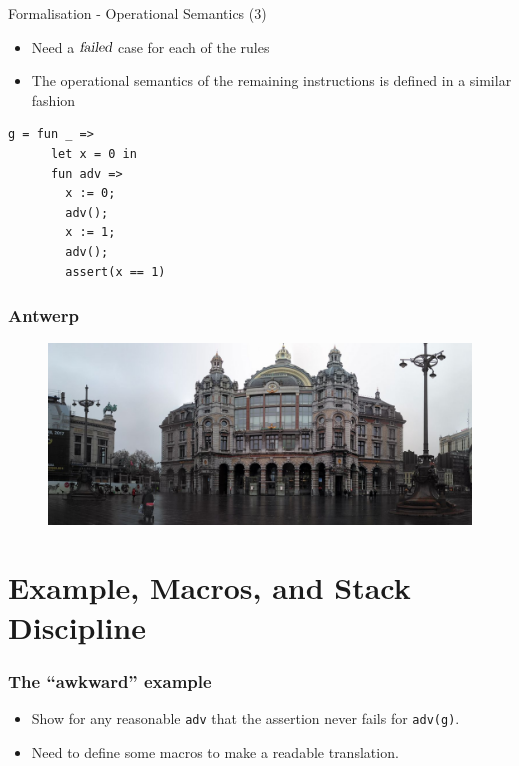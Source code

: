 \documentclass{beamer}
\newcommand{\failed}{\textsl{failed}}
\begin{document}
\begin{frame}{Formalisation - Operational Semantics (3)}
  \begin{itemize}[<+->]
  \item Need a $\failed$ case for each of the rules
  \item The operational semantics of the remaining instructions is defined in a similar fashion
  \end{itemize}
\end{frame}

\begin{lrbox}{\awkwardex}
\begin{lstlisting}
g = fun _ => 
      let x = 0 in
      fun adv =>
        x := 0;
        adv();
        x := 1;
        adv();
        assert(x == 1)
\end{lstlisting}
\end{lrbox}

\begin{frame}
  \frametitle{Antwerp}
  \begin{figure}
    \centering
    \includegraphics[scale=0.2]{ant}
\end{figure}
\end{frame}

\section{Example, Macros, and Stack Discipline}

\begin{frame}
  \frametitle{The ``awkward'' example }
      \usebox{\awkwardex}      
      \begin{itemize}
      \item<2-> Show for any reasonable \texttt{adv} that the assertion never fails for \texttt{adv(g)}.
      \item<3-> Need to define some macros to make a readable translation.
      \end{itemize}
\end{frame}
\end{document}
